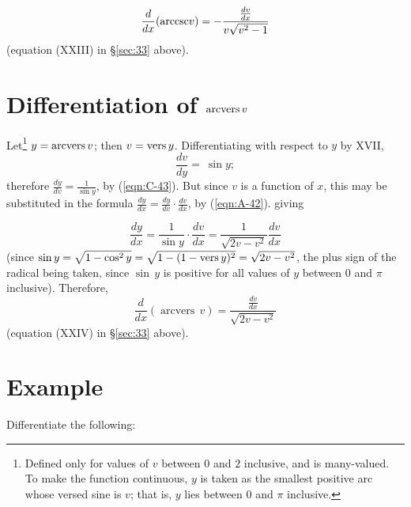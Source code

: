 \[
\frac{d}{dx}({\rm arccsc} v) 	= -\frac{\frac{dv}{dx}}{v\sqrt{v^2 - 1}}
\]
(equation (XXIII) in \S \ref{sec:33}  above).


\section{Differentiation of ${\rm arcvers}\, v$}

Let\footnote{Defined only for values of $v$ between $0$ and $2$ inclusive, and is 
many-valued. To make the function continuous, $y$ is taken as the smallest positive 
arc whose versed sine is $v$; that is, $y$ lies between $0$ and $\pi$ inclusive. 
}
$y 	= {\rm arcvers}\, v$; then $v = {\rm vers}\, y$.
Differentiating with respect to $y$ by XVII,
\[
  	\frac{dv}{dy} 	=\ \sin y;
\]
therefore $\frac{dy}{dv} 	= \frac{1}{\sin y}$, by (\ref{eqn:C-43}). %
But since $v$ is a function of $x$, this may be substituted in the formula
$\frac{dy}{dx} 	= \frac{dy}{dv} \cdot \frac{dv}{dx}$, by (\ref{eqn:A-42}).%
giving 	

\[
\frac{dy}{dx} 	= \frac{1}{\sin y} \cdot \frac{dv}{dx}
  	= \frac{1}{\sqrt{2v - v^2}} \frac{dv}{dx}
\]
(since $\sin y = \sqrt{1 - \cos^2 y} = \sqrt{1 - (1 - {\rm vers}\, y)^2} 
= \sqrt{2v - v^2}$, the plus sign of the radical being taken, since $\sin\, y$ 
is positive for all values of $y$ between $0$ and $\pi$ inclusive).
Therefore,
\[
\frac{d}{dx} (\operatorname{arcvers}\, v) 	= \frac{\frac{dv}{dx}}{\sqrt{2v - v^2}}
\]
(equation (XXIV) in \S \ref{sec:33}  above).


\section{Example}

Differentiate the following:


